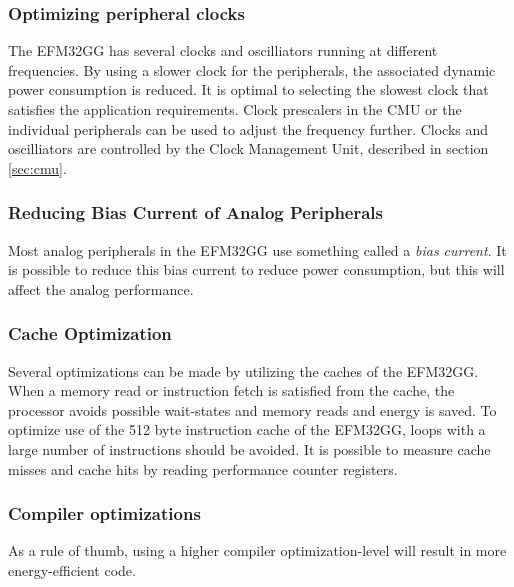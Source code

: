 \subsubsection{Optimizing peripheral clocks}
The EFM32GG has several clocks and oscilliators running at different frequencies. By using a slower clock for the peripherals, the associated dynamic power consumption is reduced. It is optimal to selecting the slowest clock that satisfies the application requirements. Clock prescalers in the CMU or the individual peripherals can be used to adjust the frequency further. Clocks and oscilliators are controlled by the Clock Management Unit, described in section \ref{sec:cmu}.\cite{efm32-energy-optimization} 


\subsubsection{Reducing Bias Current of Analog Peripherals}
Most analog peripherals in the EFM32GG use something called a \emph{bias current}. It is possible to reduce this bias current to reduce power consumption, but this will affect the analog performance.\cite{efm32-energy-optimization}


\subsubsection{Cache Optimization}
Several optimizations can be made by utilizing the caches of the EFM32GG. When a memory read or instruction fetch is satisfied from the cache, the processor avoids possible wait-states and memory reads and energy is saved. To optimize use of the 512 byte instruction cache of the EFM32GG, loops with a large number of instructions should be avoided. It is possible to measure cache misses and cache hits by reading performance counter registers.\cite{efm32-energy-optimization}


\subsubsection{Compiler optimizations}
As a rule of thumb, using a higher compiler optimization-level will result in more energy-efficient code.


